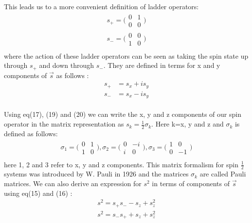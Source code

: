\documentclass[11pt]{article}   	%
\begin{document}
	This leads us to a more convenient definition of ladder operators:
	\begin{equation}
	\begin{split}
	s_+=\bigg(\begin{matrix} 0 & 1\\ 0 & 0\end{matrix}\bigg)\\
	s_-=\bigg(\begin{matrix} 0 & 0\\ 1 & 0\end{matrix}\bigg)\\
	\end{split}
	\end{equation}
	where the action of these ladder operators can be seen as taking the spin state up 
	 through $s_+$ and down through $s_-$. They are 
	defined in terms for x and y components of $\vec{s}$ as follows :
	\begin{equation}
	\begin{split}
		s_+&=s_x+is_y\\
		s_-&=s_x-is_y\\
	\end{split}
	\end{equation}
	
	Using eq(17), (19) and (20) we can write the x, y and z components of our spin operator in the matrix 
	representation as $s_k=\frac{1}{2} \sigma_k$. Here k=x, y and z and $\sigma_k$ is defined as follows:\\
	\begin{equation}
		\begin{split}
		\sigma_1=\bigg(\begin{matrix}0 & 1\\ 1 & 0\end{matrix}\bigg),
		\sigma_2=\bigg(\begin{matrix}0 & -i\\ i & 0\end{matrix}\bigg), 
		\sigma_3=\bigg(\begin{matrix}1 & 0\\ 0 & -1\end{matrix}\bigg)\\ 
		\end{split}
	\end{equation}
	here 1, 2 and 3 refer to x, y and z components. This matrix formalism for spin $\frac{1}{2}$ systems 
	was introduced by W. Pauli in 1926 and the matrices $\sigma_k$ are called Pauli matrices. 
	We can also derive an expression for $s^2$ in terms of components
	of $\vec{s}$ using eq(15) and (16) :\\
	\begin{equation}
	\begin{split}
		s^2=s_+s_--s_z+s_z^2\\
		s^2=s_-s_++s_z+s_z^2\\
	\end{split}
	\end{equation}
	
\end{document}
